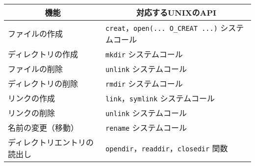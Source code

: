 \documentclass{standalone}
\def\|{\verb|} %|
\begin{document}
\begin{tabular}{l | l}\hline\hline
  \multicolumn{1}{c|}{機能} & \multicolumn{1}{c}{対応するUNIXのAPI}\\\hline
  ファイルの作成     &  \|creat|，\|open(... O_CREAT ...)| システムコール \\
  ディレクトリの作成 &  \|mkdir| システムコール \\
  ファイルの削除     &  \|unlink| システムコール \\
  ディレクトリの削除 &  \|rmdir| システムコール \\
  リンクの作成       &  \|link|，\|symlink| システムコール　\\
  リンクの削除       &  \|unlink| システムコール　\\
  名前の変更（移動） &  \|rename| システムコール\\
  ディレクトリエントリの読出し & \|opendir|，\|readdir|，\|closedir| 関数\\
\end{tabular}
\end{document}
